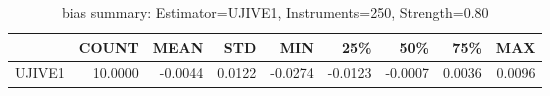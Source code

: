 \begin{table}[ht]
\centering
\caption{bias summary: Estimator=UJIVE1, Instruments=250, Strength=0.80}
\begin{tabular}{lrrrrrrrr}
\toprule
 & COUNT & MEAN & STD & MIN & 25\% & 50\% & 75\% & MAX \\
\midrule
UJIVE1 & 10.0000 & -0.0044 & 0.0122 & -0.0274 & -0.0123 & -0.0007 & 0.0036 & 0.0096 \\
\bottomrule
\end{tabular}
\end{table}
